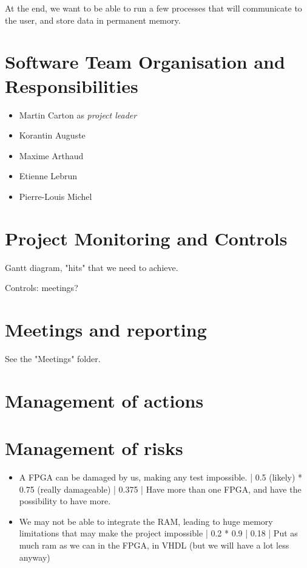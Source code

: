 \documentclass{article}
\begin{document}
    At the end, we want to be able to run a few processes that will communicate
    to the user, and store data in permanent memory.

  \section{Software Team Organisation and Responsibilities}
    \begin{itemize}
      \item Martin Carton as \textit{project leader}
      \item Korantin Auguste
      \item Maxime Arthaud
      \item Etienne Lebrun
      \item Pierre-Louis Michel
    \end{itemize}

  \section{Project Monitoring and Controls}
    Gantt diagram, "hits" that we need to achieve.

    Controls: meetings?

  \section{Meetings and reporting}
    See the "Meetings" folder.

  \section{Management of actions}

  \section{Management of risks}
    \begin{itemize}
      \item A FPGA can be damaged by us, making any test impossible. | 0.5
        (likely) * 0.75 (really damageable) | 0.375 | Have more than one FPGA,
        and have the possibility to have more.
      \item We may not be able to integrate the RAM, leading to huge memory
        limitations that may make the project impossible | 0.2 * 0.9 | 0.18 |
        Put as much ram as we can in the FPGA, in VHDL (but we will have a lot
        less anyway)
    \end{itemize}
\end{document}
